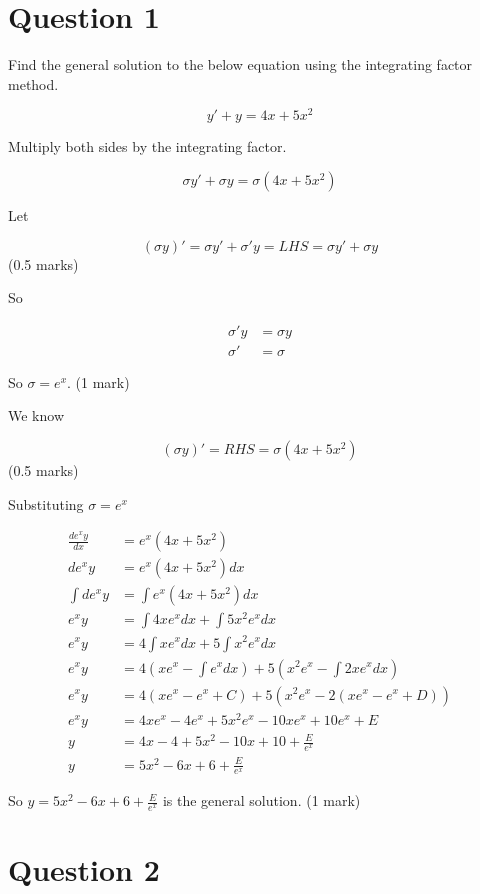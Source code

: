 \documentclass{article}
\begin{document}
\section*{Question 1}

Find the general solution to the below equation using the integrating factor
method.

$$y' + y = 4x + 5x^2$$

Multiply both sides by the integrating factor.

$$\sigma y' + \sigma y = \sigma(4x + 5x^2)$$

Let

$$(\sigma y)' = \sigma y' + \sigma' y = LHS = \sigma y' + \sigma y$$ \hfill (0.5 marks)

So

\begin{align*}
  \sigma ' y &= \sigma y
  \\ \sigma ' &= \sigma
\end{align*}

So $\sigma = e^x$. \hfill (1 mark)

We know

$$(\sigma y)' = RHS = \sigma(4x + 5x^2)$$ \hfill (0.5 marks)

Substituting $\sigma = e^x$

\begin{align*}
  \frac{d e^x y}{dx} &= e^x(4x + 5x^2)
  \\ d e^x y &= e^x(4x + 5x^2) dx
  \\ \int d e^x y &= \int e^x(4x + 5x^2) dx
  \\ e^x y &= \int 4xe^x dx + \int 5x^2e^x dx
  \\ e^x y &= 4 \int xe^x dx + 5 \int x^2e^x dx
  \\ e^x y &= 4 (xe^x - \int e^x dx) + 5(x^2e^x - \int 2xe^x dx)
  \\ e^x y &= 4 (xe^x - e^x + C) + 5(x^2e^x - 2(xe^x - e^x + D))
  \\ e^x y &= 4xe^x - 4e^x + 5x^2e^x - 10xe^x + 10e^x + E
  \\ y &= 4x - 4 + 5x^2 - 10x + 10 + \frac{E}{e^x}
  \\ y &= 5x^2 - 6x + 6 + \frac{E}{e^x} \tag{2 marks}
\end{align*}

So $y = 5x^2 - 6x + 6 + \frac{E}{e^x}$ is the general solution. \hfill (1 mark)

\section*{Question 2}
\end{document}
